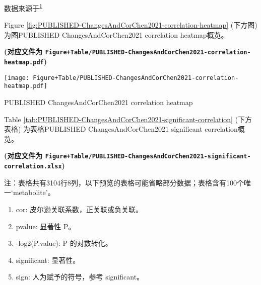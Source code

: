 \documentclass[
]{article}
\providecommand{\tightlist}{%
  \setlength{\itemsep}{0pt}\setlength{\parskip}{0pt}}
\begin{document}
数据来源于\textsuperscript{\protect\hyperlink{ref-ChangesAndCorChen2021}{1}}

Figure \ref{fig:PUBLISHED-ChangesAndCorChen2021-correlation-heatmap} (下方图) 为图PUBLISHED ChangesAndCorChen2021 correlation heatmap概览。

\textbf{(对应文件为 \texttt{Figure+Table/PUBLISHED-ChangesAndCorChen2021-correlation-heatmap.pdf})}

\def\@captype{figure}
\begin{center}
\texttt{[image: Figure+Table/PUBLISHED-ChangesAndCorChen2021-correlation-heatmap.pdf]}
\caption{PUBLISHED ChangesAndCorChen2021 correlation heatmap}\label{fig:PUBLISHED-ChangesAndCorChen2021-correlation-heatmap}
\end{center}

Table \ref{tab:PUBLISHED-ChangesAndCorChen2021-significant-correlation} (下方表格) 为表格PUBLISHED ChangesAndCorChen2021 significant correlation概览。

\textbf{(对应文件为 \texttt{Figure+Table/PUBLISHED-ChangesAndCorChen2021-significant-correlation.xlsx})}

\begin{center}\begin{tcolorbox}[colback=gray!10, colframe=gray!50, width=0.9\linewidth, arc=1mm, boxrule=0.5pt]注：表格共有3104行8列，以下预览的表格可能省略部分数据；表格含有100个唯一`metabolite'。
\end{tcolorbox}
\end{center}
\begin{center}\begin{tcolorbox}[colback=gray!10, colframe=gray!50, width=0.9\linewidth, arc=1mm, boxrule=0.5pt]\begin{enumerate}\tightlist
\item cor:  皮尔逊关联系数，正关联或负关联。
\item pvalue:  显著性 P。
\item -log2(P.value):  P 的对数转化。
\item significant:  显著性。
\item sign:  人为赋予的符号，参考 significant。
\end{enumerate}\end{tcolorbox}
\end{center}
\end{document}
